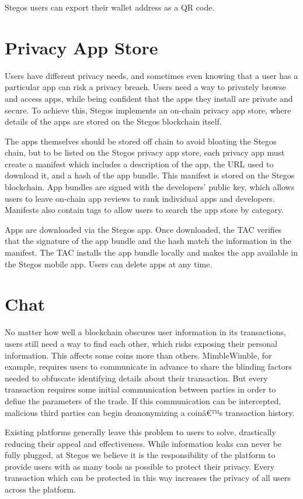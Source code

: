 \documentclass[8pt,fleqn,openany]{book}
\begin{document}
	Stegos users can export their wallet address as a QR code.
	
	\section{Privacy App Store}\label{sec:appstore}
	Users have different privacy needs, and sometimes even knowing that a user has a particular app can risk a privacy breach. Users need a way to privately browse and access apps, while being confident that the apps they install are private and secure. To achieve this, Stegos implements an on-chain privacy app store, where details of the apps are stored on the Stegos blockchain itself.
	
	The apps themselves should be stored off chain to avoid bloating the Stegos chain, but to be listed on the Stegos privacy app store, each privacy app must create a manifest which includes a description of the app, the URL used to download it, and a hash of the app bundle. This manifest is stored on the Stegos blockchain. App bundles are signed with the developers' public key, which allows users to leave on-chain app reviews to rank individual apps and developers. Manifests also contain tags to allow users to search the app store by category.
	
	Apps are downloaded via the Stegos app. Once downloaded, the TAC verifies that the signature of the app bundle and the hash match the information in the manifest. The TAC installs the app bundle locally and makes the app available in the Stegos mobile app. Users can delete apps at any time.
	
	\section{Chat}\label{sec:chat}
	No matter how well a blockchain obscures user information in its transactions, users still need a way to find each other, which risks exposing their personal information. This affects some coins more than others. MimbleWimble, for example, requires users to communicate in advance to share the blinding factors needed to obfuscate identifying details about their transaction. But every transaction requires some initial communication between parties in order to define the parameters of the trade. If this communication can be intercepted, malicious third parties can begin deanonymizing a coinâ€™s transaction history. 
	
	Existing platforms generally leave this problem to users to solve, drastically reducing their appeal and effectiveness. While information leaks can never be fully plugged, at Stegos we believe it is the responsibility of the platform to provide users with as many tools as possible to protect their privacy. Every transaction which can be protected in this way increases the privacy of all users across the platform.
	
\end{document}

